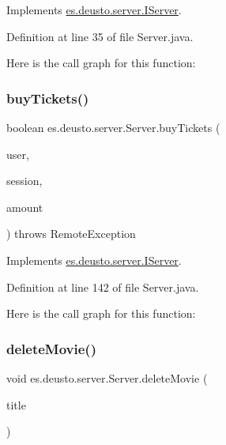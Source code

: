 Implements \mbox{\hyperlink{interfacees_1_1deusto_1_1server_1_1_i_server_a393d8689e14b3534dfa425e4c900532e}{es.\+deusto.\+server.\+I\+Server}}.



Definition at line 35 of file Server.\+java.

Here is the call graph for this function\+:
\mbox{\label{classes_1_1deusto_1_1server_1_1_server_a3bbf9f19774d2fae5c831cfac1f2306c}} 
\subsubsection{\texorpdfstring{buyTickets()}{buyTickets()}}
{\footnotesize\ttfamily boolean es.\+deusto.\+server.\+Server.\+buy\+Tickets (\begin{DoxyParamCaption}\item[{\mbox{\hyperlink{classes_1_1deusto_1_1server_1_1data_1_1_user_d_t_o}{User\+D\+TO}}}]{user,  }\item[{\mbox{\hyperlink{classes_1_1deusto_1_1server_1_1data_1_1_session_d_t_o}{Session\+D\+TO}}}]{session,  }\item[{int}]{amount }\end{DoxyParamCaption}) throws Remote\+Exception}



Implements \mbox{\hyperlink{interfacees_1_1deusto_1_1server_1_1_i_server_ac3302c01fefc37a32c0bcbf79fcce44b}{es.\+deusto.\+server.\+I\+Server}}.



Definition at line 142 of file Server.\+java.

Here is the call graph for this function\+:
\mbox{\label{classes_1_1deusto_1_1server_1_1_server_a6501e4103fcc2ef691c15e4e02f7136c}} 
\subsubsection{\texorpdfstring{deleteMovie()}{deleteMovie()}}
{\footnotesize\ttfamily void es.\+deusto.\+server.\+Server.\+delete\+Movie (\begin{DoxyParamCaption}\item[{String}]{title }\end{DoxyParamCaption})}



